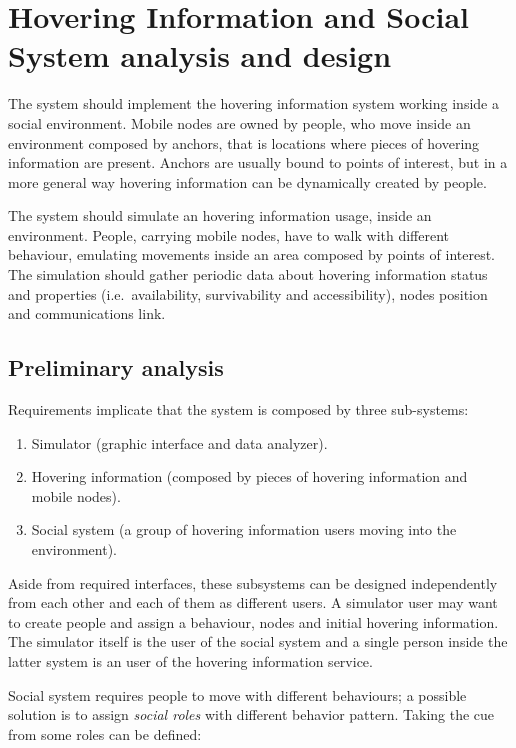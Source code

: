 \section{Hovering Information and Social System analysis and design}
\label{sec:design}

The system should implement the hovering information system working inside
a social environment. Mobile nodes are owned by people, who move inside an
environment composed by anchors, that is locations where pieces of hovering
information are present. Anchors are usually bound to points of interest, but
in a more general way hovering information can be dynamically created by people.

The system should simulate an hovering information usage, inside an
environment.  People, carrying mobile nodes, have to walk with different
behaviour, emulating movements inside an area composed by points of interest.
The simulation should gather periodic data about hovering information status
and properties (i.e.\ availability, survivability and accessibility), nodes
position and communications link.

\subsection{Preliminary analysis}

Requirements implicate that the system is composed by three sub-systems:
\begin{enumerate}
	\item Simulator (graphic interface and data analyzer).
	\item Hovering information (composed by pieces of hovering information and
		mobile nodes).
	\item Social system (a group of hovering information users moving into
		the environment).
\end{enumerate}

Aside from required interfaces, these subsystems can be designed independently
from each other and each of them as different users. A simulator user may want
to create people and assign a behaviour, nodes and initial hovering information.
The simulator itself is the user of the social system and a single person inside
the latter system is an user of the hovering information service.

Social system requires people to move with different behaviours; a possible
solution is to assign \emph{social roles} with different behavior pattern.
Taking the cue from \cite{human} some roles can be defined:

